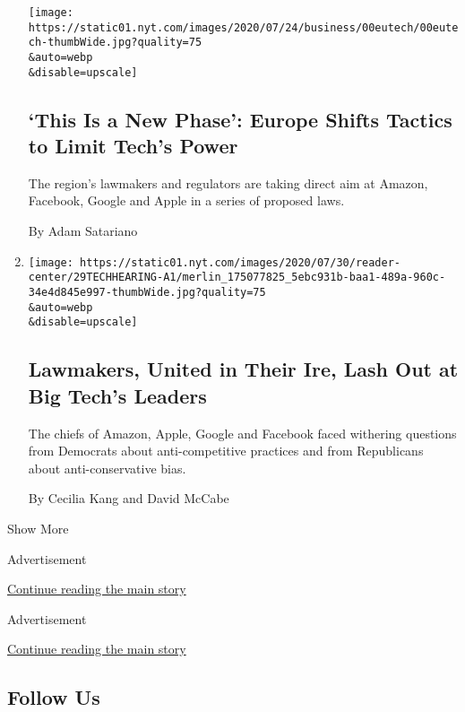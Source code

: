 \begin{enumerate}
  \texttt{[image: https://static01.nyt.com/images/2020/07/24/business/00eutech/00eutech-thumbWide.jpg?quality=75\\\&auto=webp\\\&disable=upscale]}

  \hypertarget{this-is-a-new-phase-europe-shifts-tactics-to-limit-techs-power}{%
  \subsection{`This Is a New Phase': Europe Shifts Tactics to Limit
  Tech's
  Power}\label{this-is-a-new-phase-europe-shifts-tactics-to-limit-techs-power}}

  The region's lawmakers and regulators are taking direct aim at Amazon,
  Facebook, Google and Apple in a series of proposed laws.

  By Adam Satariano
\item
  \href{/2020/07/29/technology/big-tech-hearing-apple-amazon-facebook-google.html}{}

  \texttt{[image: https://static01.nyt.com/images/2020/07/30/reader-center/29TECHHEARING-A1/merlin\_175077825\_5ebc931b-baa1-489a-960c-34e4d845e997-thumbWide.jpg?quality=75\\\&auto=webp\\\&disable=upscale]}

  \hypertarget{lawmakers-united-in-their-ire-lash-out-at-big-techs-leaders}{%
  \subsection{Lawmakers, United in Their Ire, Lash Out at Big Tech's
  Leaders}\label{lawmakers-united-in-their-ire-lash-out-at-big-techs-leaders}}

  The chiefs of Amazon, Apple, Google and Facebook faced withering
  questions from Democrats about anti-competitive practices and from
  Republicans about anti-conservative bias.

  By Cecilia Kang and David McCabe
\end{enumerate}

Show More

Advertisement

\protect\hyperlink{after-mid2}{Continue reading the main story}

Advertisement

\protect\hyperlink{after-mktg}{Continue reading the main story}

\hypertarget{follow-us}{%
\subsection{Follow Us}\label{follow-us}}

